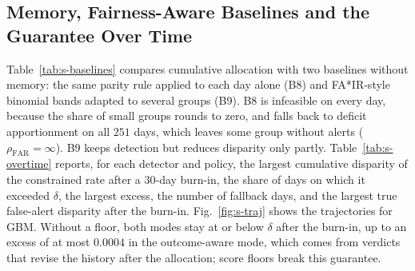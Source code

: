 \documentclass[10pt,onecolumn,letterpaper]{article}
\newcommand{\FAR}{\mathrm{FAR}}
\begin{document}
\subsection{Memory, Fairness-Aware Baselines and the Guarantee Over Time}
Table~\ref{tab:s-baselines} compares cumulative allocation with two baselines without memory: the same parity rule applied to each day alone (B8) and FA*IR-style binomial bands adapted to several groups (B9). B8 is infeasible on every day, because the share of small groups rounds to zero, and falls back to deficit apportionment on all $251$ days, which leaves some group without alerts ($\rho_{\FAR}=\infty$). B9 keeps detection but reduces disparity only partly. Table~\ref{tab:s-overtime} reports, for each detector and policy, the largest cumulative disparity of the constrained rate after a 30-day burn-in, the share of days on which it exceeded $\delta$, the largest excess, the number of fallback days, and the largest true false-alert disparity after the burn-in. Fig.~\ref{fig:s-traj} shows the trajectories for GBM. Without a floor, both modes stay at or below $\delta$ after the burn-in, up to an excess of at most $0.0004$ in the outcome-aware mode, which comes from verdicts that revise the history after the allocation; score floors break this guarantee.
\end{document}
